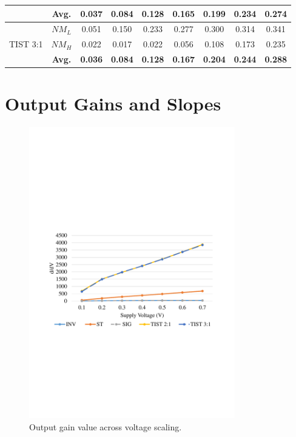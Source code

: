 \documentclass[diss,pgmicro,english]{iiufrgs}
\begin{document}
\begin{table}[H]
{\begin{tabular}{|c|c|c|c|c|c|c|c|c|}
 			  & \textbf{Avg.} & \textbf{0.037} & \textbf{0.084} & \textbf{0.128} & \textbf{0.165} & \textbf{0.199} & \textbf{0.234} & \textbf{0.274} \\ \hline
\multirow{3}{*}{TIST 3:1} & $NM_{L}$      & 0.051          & 0.150          & 0.233          & 0.277          & 0.300          & 0.314          & 0.341          \\ \cline{2-9}
                          & $NM_{H}$      & 0.022          & 0.017          & 0.022          & 0.056          & 0.108          & 0.173          & 0.235          \\ \cline{2-9}
                          & \textbf{Avg.} & \textbf{0.036} & \textbf{0.084} & \textbf{0.128} & \textbf{0.167} & \textbf{0.204} & \textbf{0.244} & \textbf{0.288} \\ \hline
\end{tabular}%
}
\end{table}

\section{Output Gains and Slopes}

    \begin{figure}[t]
        \centering
            \includegraphics[width=0.8\textwidth, trim={1.25cm 9cm 2cm 10cm}, clip]{gainComp.pdf}
            \caption{Output gain value across voltage scaling.}
        \label{figsGainComp}
    \end{figure}
\end{document}
